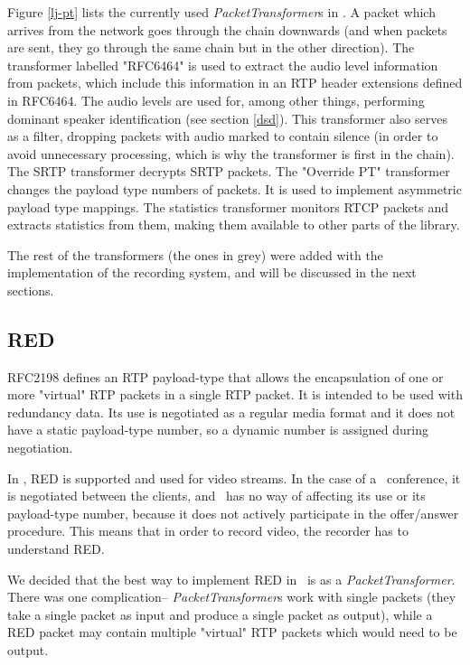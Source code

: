 \documentclass[twoside,openright,a4paper,12pt,english]{article}
\begin{document}
Figure \ref{lj-pt} lists the currently used \emph{PacketTransformer}s in \lj. A
packet which arrives from the network goes through the chain downwards (and
when packets are sent, they go through the same chain but in the other
direction). The transformer labelled "RFC6464" is used to extract the
audio level information from packets, which include this information in
an RTP header extensions defined in RFC6464\cite{rfc6464}. The audio
levels are used for, among other things, performing dominant speaker
identification (see section \ref{dsd}). This transformer also serves
as a filter, dropping packets with audio marked to contain silence (in order to
avoid unnecessary processing, which is why the transformer is first in the
chain). The SRTP transformer decrypts SRTP packets. The
"Override PT" transformer changes the payload type numbers of packets. It is
used to implement asymmetric payload type mappings. The statistics transformer
monitors RTCP packets and extracts statistics from them, making them available
to other parts of the library.

The rest of the transformers (the ones in grey) were added with the
implementation of the recording system, and will be discussed in the next
sections.




\subsection{RED}
\label{red}
RFC2198\cite{red} defines an RTP payload-type that allows the encapsulation of
one or more "virtual" RTP packets in a single RTP packet. It is intended to be
used with redundancy data. Its use is negotiated as a regular media format and
it does not have a static payload-type number, so a dynamic number is assigned
during negotiation.

In \wrtc, RED is supported and used for video streams. In the case of a \jm\
conference, it is negotiated between the clients, and \jvb\ has no way of
affecting its use or its payload-type number, because it does not actively
participate in the offer/answer procedure. This means that in order to record
video, the recorder has to understand RED.

\smallskip
We decided that the best way to implement RED in \lj\ is as
a \emph{PacketTransformer}. There was one complication--
\emph{PacketTransformer}s work with single packets (they take a single packet
as input and produce a single packet as output), while a RED packet may contain
multiple "virtual" RTP packets which would need to be output.
\end{document}
